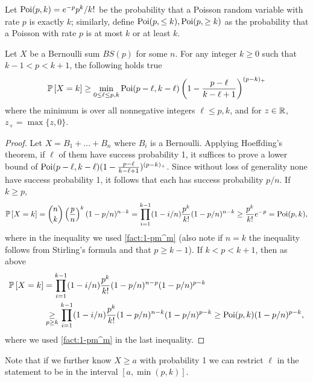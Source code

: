 Let $\textup{Poi}(p,k) = e^{-p}p^k/k!$  be the probability that a Poisson random variable with rate $p$ is exactly $k$; similarly, define $\textup{Poi}(p,\leq k),\textup{Poi}(p,\geq k)$ as the probability that a Poisson with rate $p$ is at most $k$ or at least $k$.
\begin{lemma}%
\label{thm:rayleigh_expectconstprob}
Let $X$ be a Bernoulli sum $BS(p)$ for some $n$. 
 For any integer $k\geq 0$ such that $k-1<p<k+1$, the following holds true
$${\mathbb{P}}\left[X=k\right] \geq \min_{0\leq\ell \leq p,k} \textup{Poi}(p-\ell,k-\ell) \left(1-\frac{p-\ell}{k-\ell+1}\right)^{(p-k)_+}$$
where the minimum is over all nonnegative integers $\ell\leq p,k$, and for $z\in \mathbb{R}$, $z_+=\max\{z,0\}$. 
\end{lemma}
\begin{proof}
Let $X = B_1 + \dots + B_n$ where $B_i$ is a Bernoulli. 
Applying Hoeffding's theorem, if $\ell$ of them have success probability 1, it suffices to prove a lower bound of  $\textup{Poi}(p-\ell, k-\ell)(1-\frac{p-\ell}{k-\ell+1})^{(p-k)_+}$. Since without loss of generality none have success probability 1, it follows that each has success probability $p/n$. If $k\geq p$,
$${\mathbb{P}}\left[X=k\right] = {n\choose k}\left(\frac{p}{n}\right)^k (1-p/n)^{n-k} = \prod_{i=1}^{k-1} (1-i/n)\frac{p^k}{k!} (1-p/n)^{n-k}\geq \frac{p^k}{k!}e^{-p} = \textup{Poi}(p,k),$$
where in the  inequality we used \cref{fact:1-pm^m} (also note if $n=k$ the inequality follows from Stirling's formula and that $p\geq k-1$).
If $k<p<k+1$, then as above
\begin{align*}
{\mathbb{P}}\left[X=k\right] &= \prod_{i=1}^{k-1} (1-i/n)\frac{p^k}{k!} (1-p/n)^{n-p} (1-p/n)^{p-k} \\ &\underset{p \ge k}{\ge} \prod_{i=1}^{k-1} (1-i/n)\frac{p^k}{k!} (1-p/n)^{n-k} (1-p/n)^{p-k} \ge  \textup{Poi}(p,k)(1-p/n)^{p-k},
\end{align*}
where we used \cref{fact:1-pm^m} in the last inequality.
\end{proof}
Note that if we further know $X\geq a$ with probability 1 we can restrict $\ell$ in the statement to be in the interval $[a,\min(p,k)]$.


